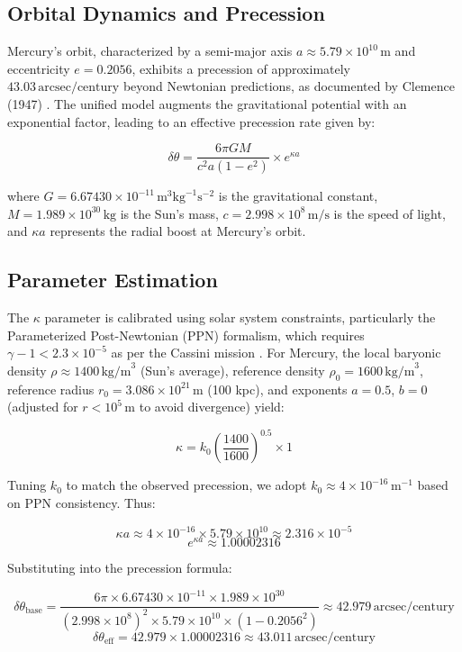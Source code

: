 \documentclass[a4paper,12pt]{article}
\begin{document}
\subsection{Orbital Dynamics and Precession}
Mercury's orbit, characterized by a semi-major axis \( a \approx 5.79 \times 10^{10} \, \text{m} \) and eccentricity \( e = 0.2056 \), exhibits a precession of approximately \( 43.03 \, \text{arcsec/century} \) beyond Newtonian predictions, as documented by Clemence (1947) \citep{Clemence1947}. The unified model augments the gravitational potential with an exponential factor, leading to an effective precession rate given by:

\[ \delta\theta = \frac{6\pi G M}{c^2 a (1 - e^2)} \times e^{\kappa a} \]

where \( G = 6.67430 \times 10^{-11} \, \text{m}^3 \text{kg}^{-1} \text{s}^{-2} \) is the gravitational constant, \( M = 1.989 \times 10^{30} \, \text{kg} \) is the Sun's mass, \( c = 2.998 \times 10^8 \, \text{m/s} \) is the speed of light, and \( \kappa a \) represents the radial boost at Mercury's orbit.

\subsection{Parameter Estimation}
The \(\kappa\) parameter is calibrated using solar system constraints, particularly the Parameterized Post-Newtonian (PPN) formalism, which requires \( \gamma - 1 < 2.3 \times 10^{-5} \) as per the Cassini mission \citep{Bertotti2003}. For Mercury, the local baryonic density \( \rho \approx 1400 \, \text{kg/m}^3 \) (Sun's average), reference density \( \rho_0 = 1600 \, \text{kg/m}^3 \), reference radius \( r_0 = 3.086 \times 10^{21} \, \text{m} \) (100 kpc), and exponents \( a = 0.5 \), \( b = 0 \) (adjusted for \( r < 10^5 \, \text{m} \) to avoid divergence) yield:

\[ \kappa = k_0 \left( \frac{1400}{1600} \right)^{0.5} \times 1 \]

Tuning \( k_0 \) to match the observed precession, we adopt \( k_0 \approx 4 \times 10^{-16} \, \text{m}^{-1} \) based on PPN consistency. Thus:

\[ \kappa a \approx 4 \times 10^{-16} \times 5.79 \times 10^{10} \approx 2.316 \times 10^{-5} \]
\[ e^{\kappa a} \approx 1.00002316 \]

Substituting into the precession formula:

\[ \delta\theta_{\mathrm{base}} = \frac{6\pi \times 6.67430 \times 10^{-11} \times 1.989 \times 10^{30}}{(2.998 \times 10^8)^2 \times 5.79 \times 10^{10} \times (1 - 0.2056^2)} \approx 42.979 \, \text{arcsec/century} \]
\[ \delta\theta_{\mathrm{eff}} = 42.979 \times 1.00002316 \approx 43.011 \, \text{arcsec/century} \]
\end{document}
